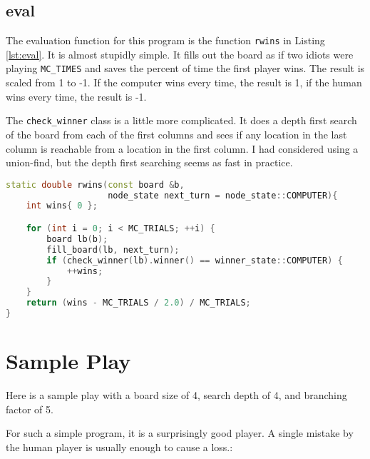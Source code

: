 \documentclass[12pt,titlepage]{amsart}
\begin{document}
\subsection{eval}

The evaluation function for this program is the function \texttt{rwins} in
Listing \ref{lst:eval}. It is almost stupidly simple. It fills out the board as
if two idiots were playing \texttt{MC\_TIMES} and saves the percent of time the
first player wins. The result is scaled from 1 to -1. If the computer wins every
time, the result is 1, if the human wins every time, the result is -1.

The \texttt{check\_winner} class is a little more complicated. It does a depth
first search of the board from each of the first columns and sees if any
location in the last column is reachable from a location in the first column.  I
had considered using a union-find, but the depth first searching seems as fast
in practice.

\singlespacing
\begin{lstlisting}[language=C++,float,
                  label={lst:eval},basicstyle=\small,
                  caption=Evaluation Function]
static double rwins(const board &b,
                    node_state next_turn = node_state::COMPUTER){
    int wins{ 0 };

    for (int i = 0; i < MC_TRIALS; ++i) {
        board lb(b);
        fill_board(lb, next_turn);
        if (check_winner(lb).winner() == winner_state::COMPUTER) {
            ++wins;
        }
    }
    return (wins - MC_TRIALS / 2.0) / MC_TRIALS;
}
\end{lstlisting}
\doublespacing

\FloatBarrier
\section{Sample Play}

Here is a sample play with a board size of 4, search depth of 4, and branching
factor of 5.

For such a simple program, it is a surprisingly good player. A single mistake by
the human player is usually enough to cause a loss.:
\end{document}
